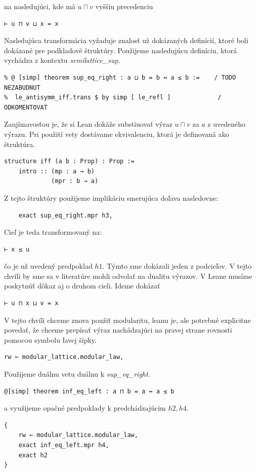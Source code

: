 \documentclass[a4paper,10pt,oneside]{report}%
\begin{document}
na nasledujúci, kde má $u \sqcap v$ vyššiu precedenciu
\begin{lstlisting}
⊢ u ⊓ v ⊔ x = x
\end{lstlisting}
    Nasledujúca transformácia vyžaduje znalosť už dokázaných definícií, ktoré
boli dokázané pre podkladové štruktúry. Použijeme nasledujúcu definíciu, ktorá vychádza
z kontextu \emph{semilattice\_sup}.
\begin{lstlisting}
% @ [simp] theorem sup_eq_right : a ⊔ b = b ↔ a ≤ b :=    / TODO NEZABUDNUT
%  le_antisymm_iff.trans $ by simp [ le_refl ]             / ODKOMENTOVAT
\end{lstlisting}
    Zaujímavosťou je, že si Lean dokáže substiuovať výraz $u \sqcap v$ za $a$ z uvedeného
výrazu. Pri použití vety dostávame ekvivalenciu, ktorá je definovaná ako štruktúra.
\begin{lstlisting}
structure iff (a b : Prop) : Prop :=
    intro :: (mp : a → b)
             (mpr : b → a)
\end{lstlisting}
Z tejto štruktúry použijeme implikáciu smerujúca doľava nasledovne:
\begin{lstlisting}
    exact sup_eq_right.mpr h3,
\end{lstlisting}
    Cieľ je teda transformovaný na:
\begin{lstlisting}
⊢ x ≤ u
\end{lstlisting}
čo je už uvedený predpoklad $h1$. Týmto sme dokázali jeden z podcieľov.
    V tejto chvíli by sme sa v literatúre mohli odvolať na dualitu výrazov.
    V Leane musíme poskytnúť dôkaz aj o druhom cieli. Ideme dokázať
\begin{lstlisting}
⊢ u ⊓ x ⊔ v = x
\end{lstlisting}
V tejto chvíli chceme znova použiť modularitu, leanu je, ale potrebné explicitne povedať,
    že chceme prepísať výraz nachádzajúci na pravej strane rovnosti pomocou symbolu
ľavej šípky.
\begin{lstlisting}
rw ← modular_lattice.modular_law,
\end{lstlisting}
    Použijeme duálnu vetu
    duálnu k \emph{sup\_eq\_right}.
\begin{lstlisting}
@[simp] theorem inf_eq_left : a ⊓ b = a ↔ a ≤ b
\end{lstlisting}
    a využijeme opačné predpoklady k predchádzajúcim $h2, h4$.
\begin{lstlisting}
{
    rw ← modular_lattice.modular_law,
    exact inf_eq_left.mpr h4,
    exact h2
}
\end{lstlisting}
\end{document}
